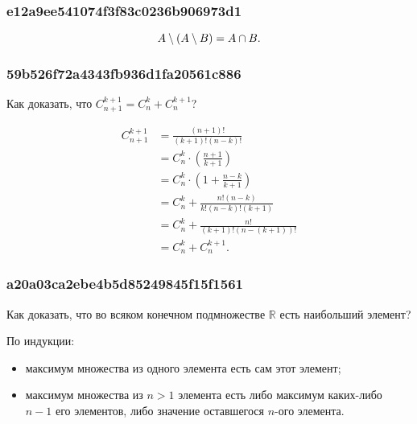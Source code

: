 \documentclass[11pt, a5paper]{article}
\newenvironment{note}[1]{\goodbreak\par\subsubsection{\hfill \color{lightgray}\tiny #1}}{}
\newenvironment{cloze}[2][\ldots]{\begin{leftbar}}{\end{leftbar}}
\newenvironment{icloze}[2][\ldots]{\ignorespaces}{\unskip}
\begin{document}
    \begin{note}{e12a9ee541074f3f83c0236b906973d1}
        \[
            A \setminus (A \setminus B) = \begin{icloze}{1}A \cap B.\end{icloze}
        \]
    \end{note}

    \begin{note}{59b526f72a4343fb936d1fa20561c886}
        Как доказать, что \; \( C_{n + 1}^{k + 1} = C_n^k + C_n^{k + 1} \)?
        \begin{cloze}{1}
            \begin{align*}
                C_{n + 1}^{k + 1} &= \frac{(n + 1)!}{(k + 1)!(n - k)!} \\
                &= C_n^k \cdot \left( \frac{n + 1}{k + 1}  \right) \\
                &= C_n^k \cdot \left( 1 + \frac{n - k}{k + 1}  \right) \\
                &= C_n^k + \frac{n! (n - k)}{k!(n - k)!(k + 1)} \\
                &= C_n^k + \frac{n!}{(k + 1)!(n - (k + 1))!} \\
                &= C_n^k + C_n^{k + 1}.
            \end{align*}
        \end{cloze}
    \end{note}

    \begin{note}{a20a03ca2ebe4b5d85249845f15f1561}
        Как доказать, что во всяком конечном подмножестве \(\mathbb{R}\) есть
        наибольший элемент?

        \begin{cloze}{1}
            По индукции:
            \begin{itemize}
                \item максимум множества из одного элемента есть сам этот
                    элемент;
                \item максимум множества из \( n > 1 \) элемента есть либо
                    максимум каких-либо \( n - 1 \) его элементов, либо значение
                    оставшегося \( n \)-ого элемента.
            \end{itemize}
        \end{cloze}
    \end{note}
\end{document}
